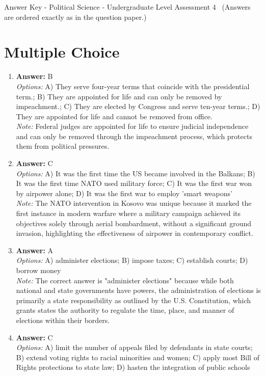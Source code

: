 \documentclass[12pt]{article}
\begin{document}
\begin{center}
Answer Key - Political Science - Undergraduate Level Assessment 4 \
\small (Answers are ordered exactly as in the question paper.)
\end{center}

\section*{Multiple Choice}
\begin{enumerate}[label=\arabic*.]
\item \textbf{Answer:} B
\\ \textit{Options:} A) They serve four-year terms that coincide with the presidential term.; B) They are appointed for life and can only be removed by impeachment.; C) They are elected by Congress and serve ten-year terms.; D) They are appointed for life and cannot be removed from office.
\\ \textit{Note:} Federal judges are appointed for life to ensure judicial independence and can only be removed through the impeachment process, which protects them from political pressures.
\item \textbf{Answer:} C
\\ \textit{Options:} A) It was the first time the US became involved in the Balkans; B) It was the first time NATO used military force; C) It was the first war won by airpower alone; D) It was the first war to employ 'smart weapons'
\\ \textit{Note:} The NATO intervention in Kosovo was unique because it marked the first instance in modern warfare where a military campaign achieved its objectives solely through aerial bombardment, without a significant ground invasion, highlighting the effectiveness of airpower in contemporary conflict.
\item \textbf{Answer:} A
\\ \textit{Options:} A) administer elections; B) impose taxes; C) establish courts; D) borrow money
\\ \textit{Note:} The correct answer is "administer elections" because while both national and state governments have powers, the administration of elections is primarily a state responsibility as outlined by the U.S. Constitution, which grants states the authority to regulate the time, place, and manner of elections within their borders.
\item \textbf{Answer:} C
\\ \textit{Options:} A) limit the number of appeals filed by defendants in state courts; B) extend voting rights to racial minorities and women; C) apply most Bill of Rights protections to state law; D) hasten the integration of public schools

\end{enumerate}
\end{document}
